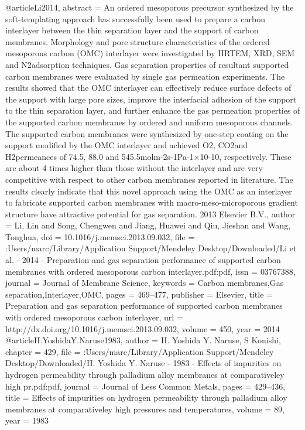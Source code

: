 @article{Li2014,
abstract = {An ordered mesoporous precursor synthesized by the soft-templating approach has successfully been used to prepare a carbon interlayer between the thin separation layer and the support of carbon membranes. Morphology and pore structure characteristics of the ordered mesoporous carbon (OMC) interlayer were investigated by HRTEM, XRD, SEM and N2adsorption techniques. Gas separation properties of resultant supported carbon membranes were evaluated by single gas permeation experiments. The results showed that the OMC interlayer can effectively reduce surface defects of the support with large pore sizes, improve the interfacial adhesion of the support to the thin separation layer, and further enhance the gas permeation properties of the supported carbon membranes by ordered and uniform mesoporous channels. The supported carbon membranes were synthesized by one-step coating on the support modified by the OMC interlayer and achieved O2, CO2and H2permeances of 74.5, 88.0 and 545.5molm-2s-1Pa-1×10-10, respectively. These are about 4 times higher than those without the interlayer and are very competitive with respect to other carbon membranes reported in literature. The results clearly indicate that this novel approach using the OMC as an interlayer to fabricate supported carbon membranes with macro-meso-microporous gradient structure have attractive potential for gas separation. {\textcopyright} 2013 Elsevier B.V.},
author = {Li, Lin and Song, Chengwen and Jiang, Huawei and Qiu, Jieshan and Wang, Tonghua},
doi = {10.1016/j.memsci.2013.09.032},
file = {:Users/marc/Library/Application Support/Mendeley Desktop/Downloaded/Li et al. - 2014 - Preparation and gas separation performance of supported carbon membranes with ordered mesoporous carbon interlayer.pdf:pdf},
issn = {03767388},
journal = {Journal of Membrane Science},
keywords = {Carbon membranes,Gas separation,Interlayer,OMC},
pages = {469--477},
publisher = {Elsevier},
title = {{Preparation and gas separation performance of supported carbon membranes with ordered mesoporous carbon interlayer}},
url = {http://dx.doi.org/10.1016/j.memsci.2013.09.032},
volume = {450},
year = {2014}
}
@article{H.YoshidaY.Naruse1983,
author = {{H. Yoshida Y. Naruse}, S Konishi},
chapter = {429},
file = {:Users/marc/Library/Application Support/Mendeley Desktop/Downloaded/H. Yoshida Y. Naruse - 1983 - Effects of impurities on hydrogen permeability through palladium alloy membranes at comparativeley high pr.pdf:pdf},
journal = {Journal of Less Common Metals},
pages = {429--436},
title = {{Effects of impurities on hydrogen permeability through palladium alloy membranes at comparativeley high pressures and temperatures}},
volume = {89},
year = {1983}
}
